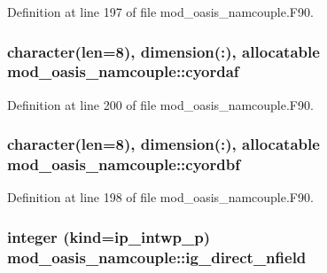 Definition at line 197 of file mod\+\_\+oasis\+\_\+namcouple.\+F90.

\hypertarget{classmod__oasis__namcouple_a68de802180c51365e7d4bcc5180ac93b}{
\subsubsection[{cyordaf}]{\setlength{\rightskip}{0pt plus 5cm}character(len=8), dimension(\+:), allocatable mod\+\_\+oasis\+\_\+namcouple\+::cyordaf\hspace{0.3cm}{\ttfamily [private]}}}\label{classmod__oasis__namcouple_a68de802180c51365e7d4bcc5180ac93b}


Definition at line 200 of file mod\+\_\+oasis\+\_\+namcouple.\+F90.

\hypertarget{classmod__oasis__namcouple_ae1debe43f1c5cffeeb1d0d9ab563f4c4}{
\subsubsection[{cyordbf}]{\setlength{\rightskip}{0pt plus 5cm}character(len=8), dimension(\+:), allocatable mod\+\_\+oasis\+\_\+namcouple\+::cyordbf\hspace{0.3cm}{\ttfamily [private]}}}\label{classmod__oasis__namcouple_ae1debe43f1c5cffeeb1d0d9ab563f4c4}


Definition at line 198 of file mod\+\_\+oasis\+\_\+namcouple.\+F90.

\hypertarget{classmod__oasis__namcouple_a531825c07a164f6139e5eebd59e295a2}{
\subsubsection[{ig\+\_\+direct\+\_\+nfield}]{\setlength{\rightskip}{0pt plus 5cm}integer (kind=ip\+\_\+intwp\+\_\+p) mod\+\_\+oasis\+\_\+namcouple\+::ig\+\_\+direct\+\_\+nfield\hspace{0.3cm}{\ttfamily [private]}}}\label{classmod__oasis__namcouple_a531825c07a164f6139e5eebd59e295a2}


